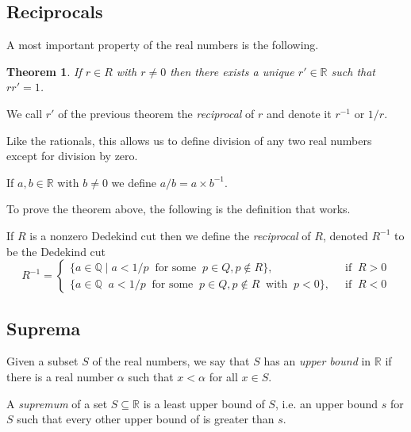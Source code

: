 \documentclass[10pt]{article}
\newcommand{\Q}{\mathbb{Q}}
\newcommand{\R}{\mathbb{R}}
\newtheorem{theorem}{Theorem}[section]
\newenvironment{definition}[1][Definition]{\begin{trivlist}
\item[\hskip \labelsep {\bfseries #1}]}{\end{trivlist}}
\begin{document}
\subsection{Reciprocals}

A most important property of the real numbers is the following.

\begin{theorem}
If $r \in R$ with $r \neq 0$ then there exists a unique $r' \in \R$ such that $rr' = 1$. 
\end{theorem}

\begin{definition}
We call $r'$ of the previous theorem the \emph{reciprocal} of $r$ and denote it $r^{-1}$ or $1/r$.
\end{definition}

Like the rationals, this allows us to define division of any two real numbers except for division by zero.

\begin{definition}
If $a, b \in \R$ with $b \neq 0$ we define $a/b = a\times b^{-1}$.
\end{definition}

To prove the theorem above, the following is the definition that works.

\begin{definition}
If $R$ is a nonzero Dedekind cut then we define the \emph{reciprocal} of $R$, denoted $R^{-1}$ to be the Dedekind cut 
$$R^{-1} = \begin{cases}\{a \in \Q \;|\; a < 1/p \;\;\mbox{for some}\;\; p \in Q, p \notin R\}, & \;\;\mbox{if}\;\; R > 0\\\{a \in \Q \;\; a < 1/p \;\;\mbox{for some}\;\; p \in Q, p \notin R \;\;\mbox{with}\;\; p < 0\}, & \;\;\mbox{if}\;\; R < 0\end{cases}$$
\end{definition}

\subsection{Suprema}

\begin{definition}
Given a subset $S$ of the real numbers, we say that $S$ has an \emph{upper bound} in $\R$ if there is a real number $\alpha$ such that $x < \alpha$ for all $x \in S$.
\end{definition}

\begin{definition}
A \emph{supremum} of a set $S \subseteq \R$ is a least upper bound of $S$, i.e. an upper bound $s$ for $S$ such that every other upper bound of is greater than $s$.
\end{definition}
\end{document}
